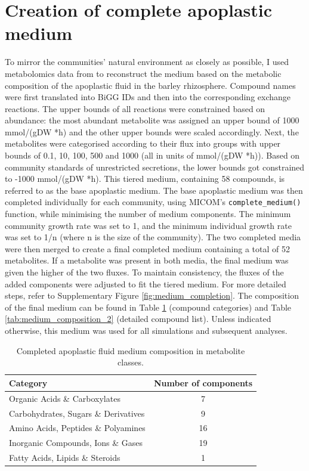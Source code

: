 \section{Creation of complete apoplastic medium}
To mirror the communities’ natural environment as closely as possible, I used metabolomics data from \cite{saake_ergosterol-induced_2025} to reconstruct the medium based on the metabolic composition of the apoplastic fluid in the barley rhizosphere. Compound names were first translated into BiGG IDs and then into the corresponding exchange reactions. The upper bounds of all reactions were constrained based on abundance: the most abundant metabolite was assigned an upper bound of 1000 mmol/(gDW *h) and the other upper bounds were scaled accordingly. Next, the metabolites were categorised according to their flux into groups with upper bounds of 0.1, 10, 100, 500 and 1000 (all in units of mmol/(gDW *h)). Based on community standards of unrestricted secretions, the lower bounds got constrained to -1000 mmol/(gDW *h). This tiered medium, containing 58 compounds, is referred to as the base apoplastic medium. 
The base apoplastic medium was then completed individually for each community, using MICOM’s \texttt{complete\_medium()} function, while minimising the number of medium components. The minimum community growth rate was set to 1, and the minimum individual growth rate was set to 1/n (where n is the size of the community). The two completed media were then merged to create a final completed medium containing a total of 52 metabolites. If a metabolite was present in both media, the final medium was given the higher of the two fluxes. To maintain consistency, the fluxes of the added components were adjusted to fit the tiered medium. For more detailed steps, refer to Supplementary Figure \ref{fig:medium_completion}. 
The composition of the final medium can be found in Table \ref{tab:apoplastic_fluid_medium} (compound categories) and Table \ref{tab:medium_composition_2} (detailed compound list). Unless indicated otherwise, this medium was used for all simulations and subsequent analyses. 

\begin{table}[htbp]
  \centering
  \caption{Completed apoplastic fluid medium composition in metabolite classes.}
  \label{tab:apoplastic_fluid_medium}
  \begin{tabular}{lc}
    \hline
    \textbf{Category} & \textbf{Number of components} \\ \hline
    Organic Acids \& Carboxylates & 7 \\
    Carbohydrates, Sugars \& Derivatives & 9 \\
    Amino Acids, Peptides \& Polyamines & 16 \\
    Inorganic Compounds, Ions \& Gases & 19 \\
    Fatty Acids, Lipids \& Steroids & 1 \\ \hline
  \end{tabular}
\end{table}


